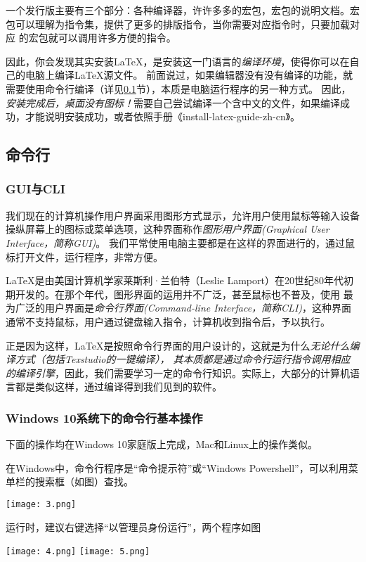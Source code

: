 一个发行版主要有三个部分：各种编译器，许许多多的宏包，宏包的说明文档。宏包可以理解为指令集，提供了更多的排版指令，当你需要对应指令时，只要加载对应
的宏包就可以调用许多方便的指令。

因此，你会发现其实安装\LaTeX{}，是安装这一门语言的\emph{编译环境}，使得你可以在自己的电脑上编译\LaTeX{}源文件。
前面说过，如果编辑器没有没有编译的功能，就需要使用命令行编译（详见\ref{subsec:mlh}节），本质是电脑运行程序的另一种方式。
因此，\emph{安装完成后，桌面没有图标！}需要自己尝试编译一个含中文的文件，如果编译成功，才能说明安装成功，或者依照手册《install-latex-guide-zh-cn》。




\subsection{命令行}\label{subsec:mlh}


\subsubsection{GUI与CLI}


我们现在的计算机操作用户界面采用图形方式显示，允许用户使用鼠标等输入设备操纵屏幕上的图标或菜单选项，这种界面称作\emph{图形用户界面(Graphical User Interface，简称GUI)}。
我们平常使用电脑主要都是在这样的界面进行的，通过鼠标打开文件，运行程序，非常方便。

\LaTeX{}是由美国计算机学家莱斯利·兰伯特（Leslie Lamport）在20世纪80年代初期开发的。在那个年代，图形界面的运用并不广泛，甚至鼠标也不普及，使用
最为广泛的用户界面是\emph{命令行界面(Command-line Interface，简称CLI)}，这种界面通常不支持鼠标，用户通过键盘输入指令，计算机收到指令后，予以执行。

正是因为这样，\LaTeX{}是按照命令行界面的用户设计的，这就是为什么\emph{无论什么编译方式（包括Texstudio的一键编译），
其本质都是通过命令行运行指令调用相应的编译引擎}，因此，我们需要学习一定的命令行知识。实际上，大部分的计算机语言都是类似这样，通过编译得到我们见到的软件。




\subsubsection{Windows 10系统下的命令行基本操作}\label{subsub:cz}


下面的操作均在Windows 10家庭版上完成，Mac和Linux上的操作类似。

在Windows中，命令行程序是“命令提示符”或“Windows Powershell”，可以利用菜单栏的搜索框（如图）查找。
\begin{center}
  \texttt{[image: 3.png]}
\end{center}运行时，建议右键选择“以管理员身份运行”，两个程序如图
\begin{center}
  \texttt{[image: 4.png]}
  \texttt{[image: 5.png]}
\end{center}


